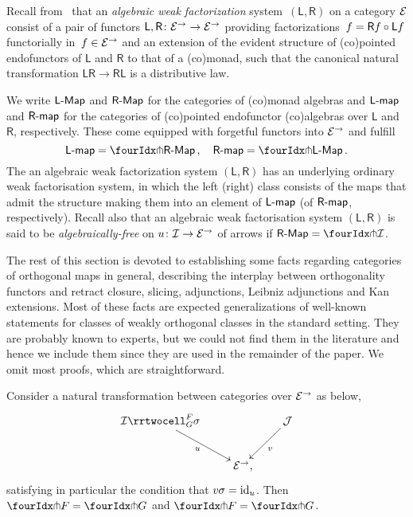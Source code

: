 \documentclass[reqno,10pt,a4paper,oneside,draft]{amsart}
\newcommand{\LL}{\mathsf{L}}
\newcommand{\RR}{\mathsf{R}}
\begin{document}
{{Recall from~\cite{garner:small-object-argument,grandis-tholen-nwfs} that an \emph{algebraic weak factorization} system~$(\LL, \RR)$ on a category $\cal{E}$ consist of a pair of functors $\LL, \RR \co \cal{E}^\to \to \cal{E}^\to$ providing factorizations~$f = \RR f \cc \LL f$ functorially in~$f \in \cal{E}^\to$ and an extension of the 
evident structure of (co)pointed endofunctors of $\LL$ and $\RR$ to that of a (co)monad, such that the canonical natural transformation $\LL \RR \to \RR \LL$ is a distributive law.


We write $\pCoalg{\LL}$ and $\pAlg{\RR}$ for the categories of (co)monad algebras and $\pcoalg{\LL}$ and $\palg{\RR}$ for the categories of (co)pointed endofunctor (co)algebras over $\LL$ and $\RR$, respectively.
These come equipped with forgetful functors into $\cal{E}^\to$ and fulfill 
\[
\pcoalg{\LL} = \liftl{\pAlg{\RR}} \, , \quad \palg{\RR} = \liftr{\pCoalg{\LL}} \, .
\]
The an algebraic weak factorization system $(\LL, \RR)$ has an underlying ordinary weak factorisation system, in which the left (right) class 
consists of the maps that admit the structure making them into an element of $\pcoalg{\LL}$ (of $\palg{\RR}$, respectively). Recall also that an algebraic weak factorisation system 
$(\LL, \RR)$ is said to be \emph{algebraically-free} on $u \co \cal{I} \to \cal{E}^\to$ of arrows if $\pAlg{\RR} = \liftr{\cal{I}}$.






The rest of this section is devoted to establishing some facts regarding categories of orthogonal maps in general, describing the interplay between orthogonality functors and retract closure, slicing, adjunctions, Leibniz adjunctions and Kan extensions. Most of these facts are expected generalizations of well-known statements for classes of weakly orthogonal classes in the standard setting.
They are probably known to experts, but we could not find them in the literature and hence we include them since they are used in the remainder of the paper. We omit  most proofs, which are straightforward. 

\begin{proposition} \label{thm:orth-nat}
Consider a natural transformation between categories over $\catE^\to$ as below,
\[
\xymatrix{
  \cal{I}
  \rrtwocell_G^F{\sigma}
 \ar[dr]_{u}
&&
  \cal{J}
  \ar[dl]^{v}
\\&
  \catE^\to
\rlap{,}}
\]
satisfying in particular the condition that $v \sigma = \id_u$.
Then $\liftr{F} = \liftr{G}$ and $\liftl{F} = \liftl{G}$.
\end{proposition}


}}
\end{document}

